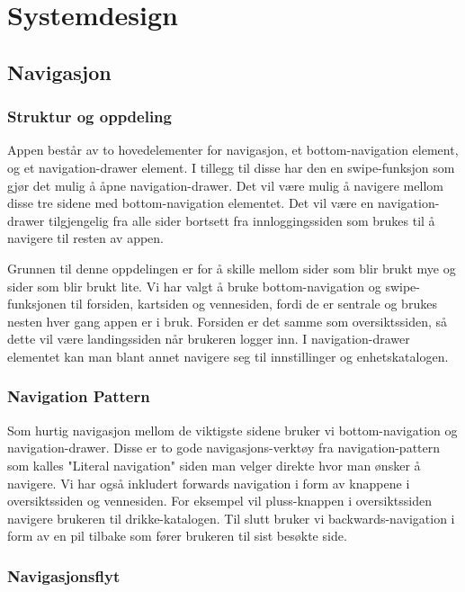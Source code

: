 \section{Systemdesign}
\subsection{Navigasjon}
\subsubsection{Struktur og oppdeling}
Appen består av to hovedelementer for navigasjon, et bottom-navigation element, og et navigation-drawer element. I tillegg til disse har den en swipe-funksjon som gjør det mulig å åpne navigation-drawer. Det vil være mulig å navigere mellom disse tre sidene med bottom-navigation elementet. Det vil være en navigation-drawer tilgjengelig fra alle sider bortsett fra innloggingssiden som brukes til å navigere til resten av appen.

Grunnen til denne oppdelingen er for å skille mellom sider som blir brukt mye og sider som blir brukt lite. Vi har valgt å bruke bottom-navigation og swipe-funksjonen til forsiden, kartsiden og vennesiden, fordi de er sentrale og brukes nesten hver gang appen er i bruk. Forsiden er det samme som oversiktssiden, så dette vil være landingssiden når brukeren logger inn. I navigation-drawer elementet kan man blant annet navigere seg til innstillinger og enhetskatalogen.

\subsubsection{Navigation Pattern}
Som hurtig navigasjon mellom de viktigste sidene bruker vi bottom-navigation og navigation-drawer. Disse er to gode navigasjons-verktøy fra navigation-pattern som kalles "Literal navigation" siden man velger direkte hvor man ønsker å navigere. Vi har også inkludert forwards navigation i form av knappene i oversiktssiden og vennesiden. For eksempel vil pluss-knappen i oversiktssiden navigere brukeren til drikke-katalogen. Til slutt bruker vi backwards-navigation i form av en pil tilbake som fører brukeren til sist besøkte side.

\subsubsection{Navigasjonsflyt}

